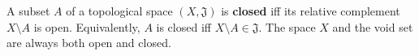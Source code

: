 A subset $A$ of a topological space $(X, \mathfrak{J})$ is \textbf{closed} iff its relative complement $X \setminus A$ is open. Equivalently, $A$ is closed iff $X \setminus A \in \mathfrak{J}$. The space $X$ and the void set are always both open and closed.
